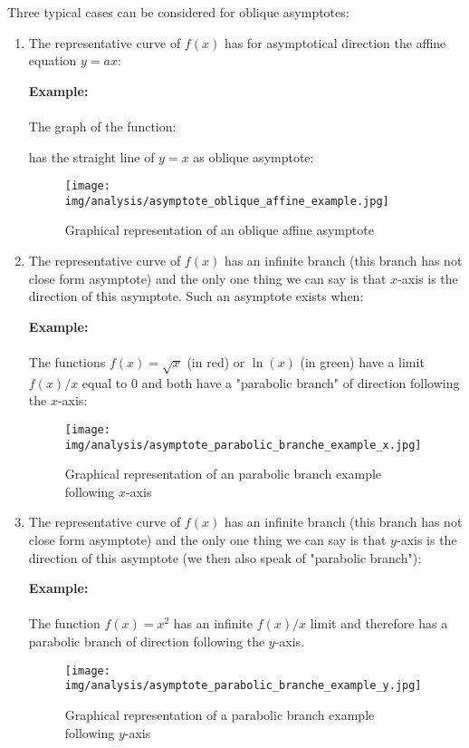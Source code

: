 \begin{enumerate}
		Three typical cases can be considered for oblique asymptotes:
		\begin{enumerate}
			\item The representative curve of $f(x)$ has for asymptotical direction the affine equation $y=ax$:
			
			\begin{tcolorbox}[colframe=black,colback=white,sharp corners]
			\textbf{{\Large {}}Example:}\\\\
			The graph of the function:
			
			 has the straight line of $y=x$ as oblique asymptote:
			 \begin{figure}[H]
				\centering
				\texttt{[image: img/analysis/asymptote\_oblique\_affine\_example.jpg]}
				\caption{Graphical representation of an oblique affine asymptote}
			\end{figure}
			\end{tcolorbox}
			
			\item The representative curve of $f(x)$ has an infinite branch (this branch has not close form asymptote) and the only one thing we can say is that $x$-axis is the direction of this asymptote. Such an asymptote exists when:
			
			\begin{tcolorbox}[colframe=black,colback=white,sharp corners]
			\textbf{{\Large {}}Example:}\\\\
			The functions $f(x)=\sqrt{x}$ (in red) or $\ln(x)$ (in green) have a limit $f(x)/x$ equal to $0$ and both have a "parabolic branch"  of direction following the $x$-axis:
			 \begin{figure}[H]
				\centering
				\texttt{[image: img/analysis/asymptote\_parabolic\_branche\_example\_x.jpg]}
				\caption[]{Graphical representation of an parabolic branch example following $x$-axis}
			\end{figure}
			\end{tcolorbox}
			
			\item The representative curve of $f(x)$ has an infinite branch (this branch has not close form asymptote) and the only one thing we can say is that $y$-axis is the direction of this asymptote (we then also speak of "parabolic branch"):
			
			\begin{tcolorbox}[colframe=black,colback=white,sharp corners]
			\textbf{{\Large {}}Example:}\\\\
			The function $f(x)=x^2$ has an infinite $f(x)/x$ limit and therefore has a parabolic branch of direction following the $y$-axis.
			 \begin{figure}[H]
				\centering
				\texttt{[image: img/analysis/asymptote\_parabolic\_branche\_example\_y.jpg]}
				\caption[]{Graphical representation of a parabolic branch example following $y$-axis}
			\end{figure}
			\end{tcolorbox}
			

\end{enumerate}
\end{enumerate}
